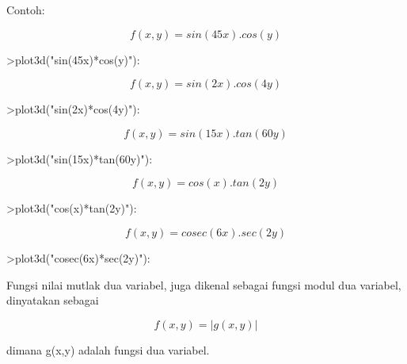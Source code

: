 \documentclass[a4paper,10pt]{article}
\begin{document}
\begin{eulernotebook}
\begin{eulercomment}
Contoh:\\
\end{eulercomment}
\begin{eulerformula}
\[
f(x,y)=sin(45x).cos(y)
\]
\end{eulerformula}
\begin{eulerprompt}
>plot3d("sin(45x)*cos(y)"):
\end{eulerprompt}
\begin{eulerformula}
\[
f(x,y)=sin(2x).cos(4y)
\]
\end{eulerformula}
\begin{eulerprompt}
>plot3d("sin(2x)*cos(4y)"):
\end{eulerprompt}
\begin{eulerformula}
\[
f(x,y)=sin(15x).tan(60y)
\]
\end{eulerformula}
\begin{eulerprompt}
>plot3d("sin(15x)*tan(60y)"):
\end{eulerprompt}
\begin{eulerformula}
\[
f(x,y)=cos(x).tan(2y)
\]
\end{eulerformula}
\begin{eulerprompt}
>plot3d("cos(x)*tan(2y)"):
\end{eulerprompt}
\begin{eulerformula}
\[
f(x,y)=cosec(6x).sec(2y)
\]
\end{eulerformula}
\begin{eulerprompt}
>plot3d("cosec(6x)*sec(2y)"):
\end{eulerprompt}
\begin{eulercomment}
Fungsi nilai mutlak dua variabel, juga dikenal sebagai fungsi modul
dua variabel, dinyatakan sebagai\\
\end{eulercomment}
\begin{eulerformula}
\[
f(x,y)=|g(x,y)|
\]
\end{eulerformula}
\begin{eulercomment}
dimana g(x,y) adalah fungsi dua variabel.


\end{eulercomment}
\end{eulernotebook}
\end{document}
